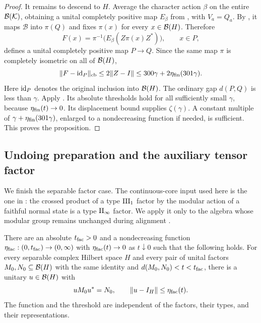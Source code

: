 \begin{proof}
It remains to descend to $H$.  Average the character action $\beta$
on the entire $\mathcal B(\mathcal K)$, obtaining a unital completely
positive map $E_\beta$ from , with
$V_a=Q_a$. By , it maps
$\mathcal B$ into $\pi(Q)$ and fixes $\pi(x)$ for every
$x\in\mathcal B(H)$.  Therefore
\begin{equation}\label{eq:core-base-ucp}
 F(x)=\pi^{-1}\bigl(E_\beta(Z\pi(x)Z^*)\bigr),\qquad x\in P,
\end{equation}
defines a unital completely positive map $P\to Q$.  Since the same
map $\pi$ is completely isometric on all of $\mathcal B(H)$,
\[
 \lVert F-\operatorname{id}_P\rVert_{\mathrm{cb}}
 \le2\lVert Z-I\rVert
 \le300\gamma+2\eta_{\rm fin}(301\gamma).
\]
Here $\operatorname{id}_P$ denotes the original inclusion into $\mathcal B(H)$.
The ordinary gap $d(P,Q)$ is less than $\gamma$.  Apply
.  Its absolute thresholds hold for all sufficiently
small $\gamma$, because $\eta_{\rm fin}(t)\to0$.  Its displacement
bound supplies $\zeta(\gamma)$.  A constant multiple of
$\gamma+\eta_{\rm fin}(301\gamma)$, enlarged to a nondecreasing
function if needed, is sufficient.  This proves the proposition.
\end{proof}

\subsection{Undoing preparation and the auxiliary tensor factor}

We finish the separable factor case.  The continuous-core input used
here is the one in : the crossed product
of a type $\mathrm{III}_1$ factor by the modular action of a faithful normal
state is a type $\mathrm{II}_\infty$ factor.  We apply it only to the algebra
whose modular group remains unchanged during alignment
\cite[Corollary~9.7, p.~297]{Takesaki1973}.

\begin{theorem}
\label{thm:factors}
There are an absolute $t_{\rm fac}>0$ and a nondecreasing function
$\eta_{\rm fac}:(0,t_{\rm fac})\to(0,\infty)$ with
$\eta_{\rm fac}(t)\to0$ as $t\downarrow0$ such that the following
holds.  For every separable complex Hilbert space $H$ and every pair
of unital factors $M_0,N_0\subseteq\mathcal B(H)$ with the same identity and
$d(M_0,N_0)<t<t_{\rm fac}$, there is a unitary $u\in\mathcal B(H)$ with
\[
 uM_0u^*=N_0,\qquad \lVert u-I_H\rVert\le\eta_{\rm fac}(t).
\]
The function and the threshold are independent of the factors, their
types, and their representations.
\end{theorem}

